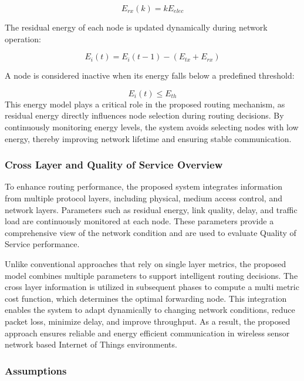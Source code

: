 \documentclass[a4paper,fleqn]{cas-dc}
\numberwithin{equation}{section}
\begin{document}
\begin{equation}
E_{rx}(k) = kE_{elec}
\label{eq:4.8}
\end{equation}

The residual energy of each node is updated dynamically during network operation:

\begin{equation}
E_i(t) = E_i(t-1) - (E_{tx} + E_{rx})
\label{eq:4.9}
\end{equation}

A node is considered inactive when its energy falls below a predefined threshold:

\begin{equation}
E_i(t) \leq E_{th}
\label{eq:4.10}
\end{equation}
This energy model plays a critical role in the proposed routing mechanism, as residual energy directly influences node selection during routing decisions. By continuously monitoring energy levels, the system avoids selecting nodes with low energy, thereby improving network lifetime and ensuring stable communication.

\subsubsection{Cross Layer and Quality of Service Overview}

To enhance routing performance, the proposed system integrates information from multiple protocol layers, including physical, medium access control, and network layers. Parameters such as residual energy, link quality, delay, and traffic load are continuously monitored at each node. These parameters provide a comprehensive view of the network condition and are used to evaluate Quality of Service performance.

Unlike conventional approaches that rely on single layer metrics, the proposed model combines multiple parameters to support intelligent routing decisions. The cross layer information is utilized in subsequent phases to compute a multi metric cost function, which determines the optimal forwarding node. This integration enables the system to adapt dynamically to changing network conditions, reduce packet loss, minimize delay, and improve throughput. As a result, the proposed approach ensures reliable and energy efficient communication in wireless sensor network based Internet of Things environments.

\subsubsection{Assumptions}
\end{document}
